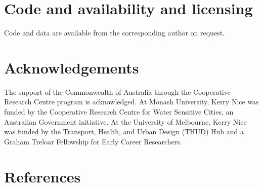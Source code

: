 \documentclass[final,3p,times,authoryear]{elsarticle}
\begin{document}
\section{Code and availability and licensing}\label{sec:available}
Code and data are available from the corresponding author on request.





\section*{Acknowledgements}
The support of the Commonwealth of Australia through the Cooperative Research Centre program is acknowledged. At Monash University, Kerry Nice was funded by the Cooperative Research Centre for Water Sensitive Cities, an Australian Government initiative. At the University of Melbourne, Kerry Nice was funded by the Transport, Health, and Urban Design (THUD) Hub and a Graham Treloar Fellowship for Early Career Researchers.
 

\section*{References}\label{sec:ref}
   
  


%
%
%


\end{document}
